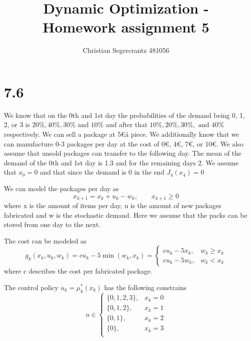 \documentclass{article}
\title{Dynamic Optimization - Homework assignment 5}
\author{Christian Segercrantz 481056}
\begin{document}
	\maketitle
	\pagebreak

\section*{7.6}

We know that on the 0th and 1st day the probabilities of the demand being 0, 1, 2, or 3 is $20\%, 40\%, 30\% \text{ and } 10\%$ and after that $10\%, 20\%, 30\%, \text{ and } 40\%$ respectively. We can sell a package at 5\euro á piece. We additionally know that we can manufacture 0-3 packages per day at the cost of 0\euro, 4\euro, 7\euro, or 10\euro. We also assume that unsold packages can transfer to the following day. The mean of the demand of the 0th and 1st day is 1.3 and for the remaining days 2. We assume that $x_0 = 0$ and that since the demand is 0 in the end $J_4(x_4) = 0$

We can model the packages per day as
\begin{equation}
	x_{k+1} = x_{k} + u_k - w_k, \qquad x_{k+1}\geq 0
\end{equation}
where x is the amount of items per day, u is the amount of new packages fabricated and w is the stochastic demand. Here we assume that the packs can be stored from one day to the next. 

The cost can be modeled as 
\begin{equation}
	g_k(x_k,u_k,w_k) = c u_k - 5\min(w_k,x_k) =
	 \begin{cases}
		c u_k - 5x_k, & w_k \geq x_k\\
		c u_k - 5w_k, & w_k < x_k
	\end{cases} 
\end{equation}
where c describes the cost per fabricated package.

The control policy $u_k = \mu^*_k(x_k)$ has the following constrains
\begin{equation}
	u \in
	\begin{cases}
		\lbrace0,1,2,3\rbrace, &x_k = 0\\
		\lbrace0,1,2\rbrace, &x_k = 1\\
		\lbrace0,1\rbrace, &x_k = 2\\
		\lbrace0\rbrace, &x_k = 3\\	
	\end{cases}
\end{equation}
\end{document}
